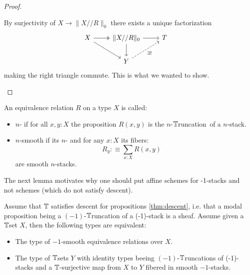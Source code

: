 \documentclass{article}
\newcommand{\truncation}{$\bT$runcation}
\newcommand{\red}[1]{{\color{red} #1}}
\begin{document}
\begin{proof}
\begin{itemize}
    By surjectivity of $X \to \|X // R \|_0$ there exists a unique factorization 
\[\begin{tikzcd}
	X & {\|X // R\|_0} & T \\
	& Y
	\arrow[two heads, from=1-1, to=1-2]
	\arrow[from=1-1, to=2-2]
	\arrow[from=1-2, to=1-3]
	\arrow[from=1-2, to=2-2]
	\arrow["{\exists!}"', dashed, from=2-2, to=1-3]
\end{tikzcd}\]
making the right triangle commute. This is what we wanted to show.
\end{itemize}
\end{proof}

\begin{definition}
An equivalence relation $R$ on a type $X$ is called:
\begin{itemize}
\item $n$- if for all $x,y:X$ the proposition $R(x,y)$ is \red{the $n$-\truncation \ of} a  $n$-stack.
\item $n$-smooth if its $n$- and for any $x:X$ its fibers:
\[R_y :\equiv \sum_{x:X} R(x,y)\]
are smooth $n$-stacks.
\end{itemize}
\end{definition}
\begin{rmk}
    The next lemma motivates why one should put affine schemes for  -1-stacks and not schemes (which do not satisfy descent).
\end{rmk}
\begin{lemma}\label{fundamental-propriety-algebraic-spaces}
Assume that $\mathbb{T}$ satisfies descent for propositions \ref{thm:descent}, i.e. that a modal proposition being a \red{$(-1)$-\truncation} of a  (-1)-stack is a sheaf. 
Assume given a $\mathbb{T}$set $X$, then the following types are equivalent:
\begin{itemize}
\item The type of $-1$-smooth equivalence relations over $X$.
\item The type of $\mathbb{T}$sets $Y$ with identity types beeing \red{$(-1)$-\truncation s of}  (-1)-stacks and a $\mathbb{T}$-surjective map from $X$ to $Y$ fibered in smooth $-1$-stacks.
\end{itemize}
\end{lemma}
\end{document}
